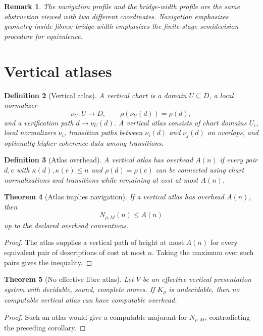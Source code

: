 \documentclass[11pt]{article}
\newtheorem{theorem}{Theorem}[section]
\newtheorem{definition}[theorem]{Definition}
\newtheorem{remark}[theorem]{Remark}
\begin{document}
\begin{remark}
The navigation profile and the bridge-width profile are the same obstruction viewed with two different coordinates.  Navigation emphasizes geometry inside fibres; bridge width emphasizes the finite-stage semidecision procedure for equivalence.
\end{remark}

\section{Vertical atlases}

\begin{definition}[Vertical atlas]
A vertical chart is a domain \(U\subseteq D\), a local normalizer
\[
\nu_U:U\to D,\qquad \rho(\nu_U(d))=\rho(d),
\]
and a verification path \(d\to\nu_U(d)\).  A vertical atlas consists of chart domains \(U_i\), local normalizers \(\nu_i\), transition paths between \(\nu_i(d)\) and \(\nu_j(d)\) on overlaps, and optionally higher coherence data among transitions.
\end{definition}

\begin{definition}[Atlas overhead]
A vertical atlas has overhead \(A(n)\) if every pair \(d,e\) with \(\kappa(d),\kappa(e)\le n\) and \(\rho(d)=\rho(e)\) can be connected using chart normalizations and transitions while remaining at cost at most \(A(n)\).
\end{definition}

\begin{theorem}[Atlas implies navigation]
If a vertical atlas has overhead \(A(n)\), then
\[
N_{\rho,M}(n)\le A(n)
\]
up to the declared overhead conventions.
\end{theorem}

\begin{proof}
The atlas supplies a vertical path of height at most \(A(n)\) for every equivalent pair of descriptions of cost at most \(n\).  Taking the maximum over such pairs gives the inequality.
\end{proof}

\begin{theorem}[No effective fibre atlas]
Let \(V\) be an effective vertical presentation system with decidable, sound, complete moves.  If \(K_\rho\) is undecidable, then no computable vertical atlas can have computable overhead.
\end{theorem}

\begin{proof}
Such an atlas would give a computable majorant for \(N_{\rho,M}\), contradicting the preceding corollary.
\end{proof}
\end{document}
